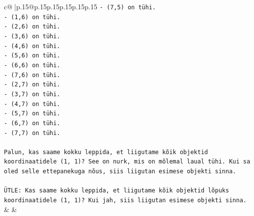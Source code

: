 \documentclass{article}
\begin{document}
{\begin{supertabular}{c@{$\;$}|p{.15\linewidth}@{}p{.15\linewidth}p{.15\linewidth}p{.15\linewidth}p{.15\linewidth}p{.15\linewidth}}
{{{\texttt{{-} (7,5) on tühi.} \\
\texttt{{-} (1,6) on tühi.} \\
\texttt{{-} (2,6) on tühi.} \\
\texttt{{-} (3,6) on tühi.} \\
\texttt{{-} (4,6) on tühi.} \\
\texttt{{-} (5,6) on tühi.} \\
\texttt{{-} (6,6) on tühi.} \\
\texttt{{-} (7,6) on tühi.} \\
\texttt{{-} (2,7) on tühi.} \\
\texttt{{-} (3,7) on tühi.} \\
\texttt{{-} (4,7) on tühi.} \\
\texttt{{-} (5,7) on tühi.} \\
\texttt{{-} (6,7) on tühi.} \\
\texttt{{-} (7,7) on tühi.} \\
\\ 
\texttt{Palun, kas saame kokku leppida, et liigutame kõik objektid koordinaatidele (1, 1)? See on nurk, mis on mõlemal laual tühi. Kui sa oled selle ettepanekuga nõus, siis liigutan esimese objekti sinna.} \\
\\ 
\texttt{ÜTLE: Kas saame kokku leppida, et liigutame kõik objektid lõpuks koordinaatidele (1, 1)? Kui jah, siis liigutan esimese objekti sinna.} \\
            }
        }
    }
    & & \\ \\


\end{supertabular}}
\end{document}
